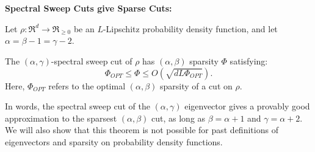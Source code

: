 \begin{theorem} \label{thm:sweep-cut} 
  \textbf{Spectral Sweep Cuts give Sparse Cuts:}

  Let $\rho:\Re^d \to \Re_{\geq 0}$ be an $L$-Lipschitz probability
  density function, and let $\alpha = \beta - 1 = \gamma - 2$.
  
  The $(\alpha,\gamma)$-spectral sweep cut of $\rho$ has 
  $(\alpha, \beta)$ sparsity $\Phi$ satisfying:
  \[ 
  \Phi_{OPT} \leq \Phi \leq O(\sqrt{dL\Phi_{OPT}} ).
  \]
  Here, $\Phi_{OPT}$ refers to the optimal $(\alpha,\beta)$ sparsity of
  a cut on $\rho$. 
\end{theorem}

In words, the spectral sweep cut of the
  $(\alpha, \gamma)$  eigenvector gives a provably good approximation to
  the sparsest $(\alpha, \beta)$ cut, as long as $\beta = \alpha+1$ and
  $\gamma = \alpha+2$.   We will also show that this theorem is not possible
  for past definitions of eigenvectors and sparsity on probability
  density functions.
